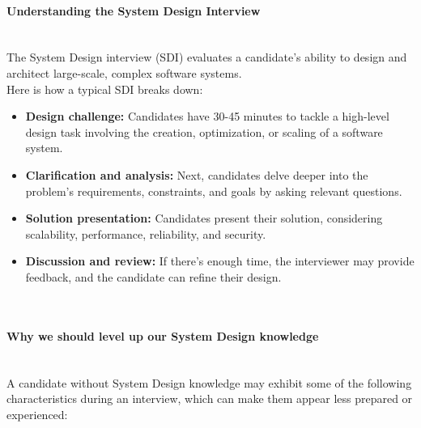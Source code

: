 \paragraph{Understanding the System Design Interview}\label{Nax80dQ2FCa1kpd4aSaIH}
\\
The System Design interview (SDI) evaluates a candidate's ability to design and architect large-scale, complex software systems.
\\
Here is how a typical SDI breaks down:

\begin{itemize}
\item
\protect{}\label{7MM73HC7RPDhghNj9ylS7}
\textbf{Design challenge:} Candidates have 30-45 minutes to tackle a high-level design task involving the creation, optimization, or scaling of a software system.
\item
\protect{}\label{SbbvSpJ_m3ceqza3FaSsP}
\textbf{Clarification and analysis:} Next, candidates delve deeper into the problem's requirements, constraints, and goals by asking relevant questions.
\item
\protect{}\label{JxSk-4d5CBpXKe8DFnYKd}
\textbf{Solution presentation:} Candidates present their solution, considering scalability, performance, reliability, and security.
\item
\protect{}\label{tteh5ztgmGyMaiaw9Th9-}
\textbf{Discussion and review:} If there's enough time, the interviewer may provide feedback, and the candidate can refine their design.
\end{itemize}
\\
\paragraph{Why we should level up our System Design knowledge}\label{PS41oevAmvh_JEzWfOfrt}
\\
A candidate without System Design knowledge may exhibit some of the following characteristics during an interview, which can make them appear less prepared or experienced:

